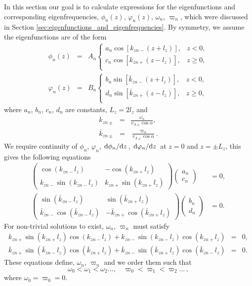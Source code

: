 \documentclass[linenumbers]{aastex63}
\begin{document}
In this section our goal is to calculate expressions for the eigenfunctions and corresponding eigenfrequencies, $\phi_n(z)$, $\varphi_n(z)$, $\omega_n$, $\varpi_n$, which were discussed in Section \ref{sec:eigenfunctions_and_eigenfrequencies}. By symmetry, we assume the eigenfunctions are of the form
\begin{eqnarray}
\phi_n(z) & = & A_n\begin{cases}
a_n\cos[k_{zn-} (z+l_z)], & z < 0, \\
c_n\cos[k_{zn+} (z-l_z)], & z \ge 0, \\
\end{cases} \\
\varphi_n(z) & = & B_n\begin{cases}
b_n\sin[\bar{k}_{zn-} (z+l_z)], & z < 0, \\
d_n\sin[\bar{k}_{zn+} (z-l_z)], & z \ge 0, \\
\end{cases}
\end{eqnarray}
where $a_n$, $b_n$, $c_n$, $d_n$ are constants, $L_z = 2l_z$ and
\begin{eqnarray}
    k_{zn\pm} & = & \frac{\omega_n}{v_{A\pm}\cos\alpha}, \\
    \bar{k}_{zn\pm} & = & \frac{\varpi_n}{v_{A\pm}\cos\alpha}.
\end{eqnarray}
We require continuity of $\phi_n$, $\varphi_n$, $\dv*{\phi_n}{z}$, $\dv*{\varphi_n}{z}$ at $z=0$ and $z=\pm L_z$, this gives the following equations
\[\begin{aligned}
\begin{pmatrix}
\cos(k_{zn-}l_z) & -\cos(k_{zn+}l_z) \\
k_{zn-}\sin(k_{zn-}l_z) & k_{zn+}\sin(k_{zn+}l_z)
\end{pmatrix}
\begin{pmatrix}
a_n \\
c_n
\end{pmatrix}
&=
0, \\
\begin{pmatrix}
\sin(\bar{k}_{zn-}l_z) & \sin(\bar{k}_{zn+}l_z) \\
\bar{k}_{zn-}\cos(\bar{k}_{zn-}l_z) & -\bar{k}_{zn+}\cos(\bar{k}_{zn+}l_z)
\end{pmatrix}
\begin{pmatrix}
b_n \\
d_n
\end{pmatrix}
&=
0.
\end{aligned}\]
For non-trivial solutions to exist, $\omega_n$, $\varpi_n$ must satisfy
\begin{eqnarray}
\label{eq:omega_n_eqn}
k_{zn+}\sin(k_{zn+}l_z)\cos(k_{zn-}l_z)+ k_{zn-}\sin(k_{zn-}l_z)\cos(k_{zn+}l_z) &=& 0, \\
\label{eq:varpi_n_eqn}
\bar{k}_{zn+}\sin(\bar{k}_{zn-}l_z)\cos(\bar{k}_{zn+}l_z)+\bar{k}_{zn-}\sin(\bar{k}_{zn+}l_z)\cos(\bar{k}_{zn-}l_z) & = & 0.
\end{eqnarray}
These equations define, $\omega_n$, $\varpi_n$ and we order them such that
\begin{equation}
    \omega_0<\omega_1<\omega_2...,\quad \varpi_0<\varpi_1<\varpi_2...\,,
\end{equation}
where $\omega_0=\varpi_0=0$.
\end{document}

